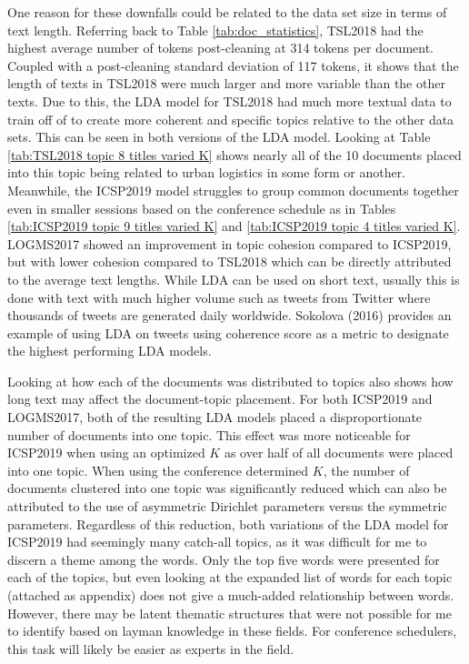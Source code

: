 \documentclass[a4paper, 12pt, twoside]{article}
\numberwithin{equation}{section} %
\begin{document}
One reason for these downfalls could be related to the data set size in terms of text length. Referring back to Table \ref{tab:doc_statistics}, TSL2018 had the highest average number of tokens post-cleaning at 314 tokens per document. Coupled with a post-cleaning standard deviation of 117 tokens, it shows that the length of texts in TSL2018 were much larger and more variable than the other texts. Due to this, the LDA model for TSL2018 had much more textual data to train off of to create more coherent and specific topics relative to the other data sets. This can be seen in both versions of the LDA model. Looking at Table \ref{tab:TSL2018 topic 8 titles varied K} shows nearly all of the 10 documents placed into this topic being related to urban logistics in some form or another. Meanwhile, the ICSP2019 model struggles to group common documents together even in smaller sessions based on the conference schedule as in Tables \ref{tab:ICSP2019 topic 9 titles varied K} and \ref{tab:ICSP2019 topic 4 titles varied K}. LOGMS2017 showed an improvement in topic cohesion compared to ICSP2019, but with lower cohesion compared to TSL2018 which can be directly attributed to the average text lengths. While LDA can be used on short text, usually this is done with text with much higher volume such as tweets from Twitter where thousands of tweets are generated daily worldwide. Sokolova (2016) \nocite{Sokolova2016} provides an example of using LDA on tweets using coherence score as a metric to designate the highest performing LDA models. 

Looking at how each of the documents was distributed to topics also shows how long text may affect the document-topic placement. For both ICSP2019 and LOGMS2017, both of the resulting LDA models placed a disproportionate number of documents into one topic. This effect was more noticeable for ICSP2019 when using an optimized $K$ as over half of all documents were placed into one topic. When using the conference determined $K$, the number of documents clustered into one topic was significantly reduced which can also be attributed to the use of asymmetric Dirichlet parameters versus the symmetric parameters. Regardless of this reduction, both variations of the LDA model for ICSP2019 had seemingly many catch-all topics, as it was difficult for me to discern a theme among the words. Only the top five words were presented for each of the topics, but even looking at the expanded list of words for each topic (attached as appendix) does not give a much-added relationship between words. However, there may be latent thematic structures that were not possible for me to identify based on layman knowledge in these fields. For conference schedulers, this task will likely be easier as experts in the field. 
\end{document}
